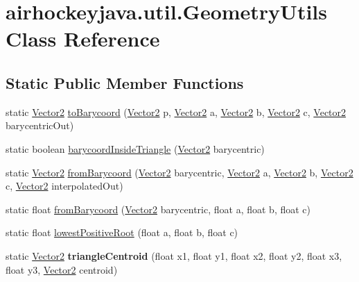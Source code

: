 \hypertarget{classairhockeyjava_1_1util_1_1_geometry_utils}{}\section{airhockeyjava.\+util.\+Geometry\+Utils Class Reference}
\label{classairhockeyjava_1_1util_1_1_geometry_utils}
\subsection*{Static Public Member Functions}
\begin{DoxyCompactItemize}
\item 
static \hyperlink{classairhockeyjava_1_1util_1_1_vector2}{Vector2} \hyperlink{classairhockeyjava_1_1util_1_1_geometry_utils_a624ab363ee8703ba98e7cbea91b9bb9b}{to\+Barycoord} (\hyperlink{classairhockeyjava_1_1util_1_1_vector2}{Vector2} p, \hyperlink{classairhockeyjava_1_1util_1_1_vector2}{Vector2} a, \hyperlink{classairhockeyjava_1_1util_1_1_vector2}{Vector2} b, \hyperlink{classairhockeyjava_1_1util_1_1_vector2}{Vector2} c, \hyperlink{classairhockeyjava_1_1util_1_1_vector2}{Vector2} barycentric\+Out)
\item 
static boolean \hyperlink{classairhockeyjava_1_1util_1_1_geometry_utils_abce380f5fbde744d788d6daf5a734867}{barycoord\+Inside\+Triangle} (\hyperlink{classairhockeyjava_1_1util_1_1_vector2}{Vector2} barycentric)
\item 
static \hyperlink{classairhockeyjava_1_1util_1_1_vector2}{Vector2} \hyperlink{classairhockeyjava_1_1util_1_1_geometry_utils_af9b4d35025c8989ceaf9f1880aba87be}{from\+Barycoord} (\hyperlink{classairhockeyjava_1_1util_1_1_vector2}{Vector2} barycentric, \hyperlink{classairhockeyjava_1_1util_1_1_vector2}{Vector2} a, \hyperlink{classairhockeyjava_1_1util_1_1_vector2}{Vector2} b, \hyperlink{classairhockeyjava_1_1util_1_1_vector2}{Vector2} c, \hyperlink{classairhockeyjava_1_1util_1_1_vector2}{Vector2} interpolated\+Out)
\item 
static float \hyperlink{classairhockeyjava_1_1util_1_1_geometry_utils_a626a926f2caaf2c5051ccef20e1b1fb3}{from\+Barycoord} (\hyperlink{classairhockeyjava_1_1util_1_1_vector2}{Vector2} barycentric, float a, float b, float c)
\item 
static float \hyperlink{classairhockeyjava_1_1util_1_1_geometry_utils_a703225e28d4c26571c6e784017d901cb}{lowest\+Positive\+Root} (float a, float b, float c)
\item 
\hypertarget{classairhockeyjava_1_1util_1_1_geometry_utils_a0e9cdd8e42a44aa5b64a9800c6f37ccd}{}static \hyperlink{classairhockeyjava_1_1util_1_1_vector2}{Vector2} {\bfseries triangle\+Centroid} (float x1, float y1, float x2, float y2, float x3, float y3, \hyperlink{classairhockeyjava_1_1util_1_1_vector2}{Vector2} centroid)\label{classairhockeyjava_1_1util_1_1_geometry_utils_a0e9cdd8e42a44aa5b64a9800c6f37ccd}


\end{DoxyCompactItemize}
